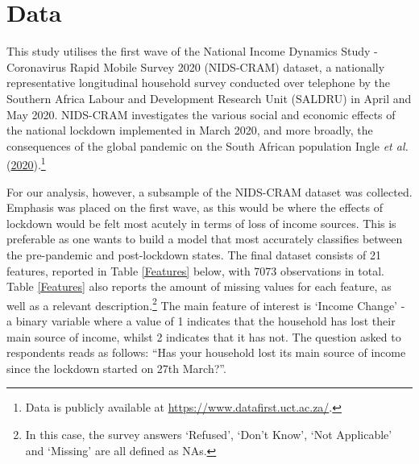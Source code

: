 \documentclass[11pt,preprint, authoryear]{elsarticle}
\numberwithin{equation}{section}
\numberwithin{figure}{section}
\numberwithin{table}{section}
\let\rmarkdownfootnote\footnote%
\def\footnote{\protect\rmarkdownfootnote}
\begin{document}
\hypertarget{data}{%
\section{\texorpdfstring{Data \label{Data}}{Data }}\label{data}}

This study utilises the first wave of the National Income Dynamics Study
- Coronavirus Rapid Mobile Survey 2020 (NIDS-CRAM) dataset, a nationally
representative longitudinal household survey conducted over telephone by
the Southern Africa Labour and Development Research Unit (SALDRU) in
April and May 2020. NIDS-CRAM investigates the various social and
economic effects of the national lockdown implemented in March 2020, and
more broadly, the consequences of the global pandemic on the South
African population Ingle \emph{et al.}
(\protect\hyperlink{ref-nids2020}{2020}).\footnote{Data is publicly
  available at \url{https://www.datafirst.uct.ac.za/}.}

For our analysis, however, a subsample of the NIDS-CRAM dataset was
collected. Emphasis was placed on the first wave, as this would be where
the effects of lockdown would be felt most acutely in terms of loss of
income sources. This is preferable as one wants to build a model that
most accurately classifies between the pre-pandemic and post-lockdown
states. The final dataset consists of 21 features, reported in Table
\ref{Features} below, with 7073 observations in total. Table
\ref{Features} also reports the amount of missing values for each
feature, as well as a relevant description.\footnote{In this case, the
  survey answers `Refused', `Don't Know', `Not Applicable' and `Missing'
  are all defined as NAs.} The main feature of interest is `Income
Change' - a binary variable where a value of 1 indicates that the
household has lost their main source of income, whilst 2 indicates that
it has not. The question asked to respondents reads as follows: ``Has
your household lost its main source of income since the lockdown started
on 27th March?''.
\end{document}
